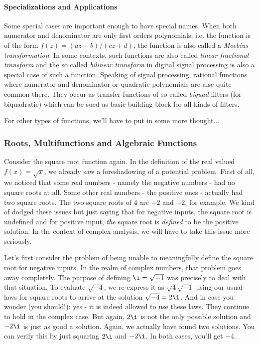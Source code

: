 \paragraph{Specializations and Applications}
Some special cases are important enough to have special names. When both numerator and denominator are only first orders polynomials, i.e. the function is of the form $f(z) = (a z  + b) / (c z + d)$, the function is also called a \emph{Moebius transformation}. In some contexts, such functions are also called \emph{linear fractional transform} and the so called \emph{bilinear transform} in digital signal processing is also a special case of such a function. Speaking of signal processing, rational functions where numerator and denominator or quadratic polynomials are alse quite common there. They occur as transfer functions of so called \emph{biquad} filters (for biquadratic) which can be sued as basic building block for all kinds of filters.


For other types of functions, we'll have to put in some more thought...



\subsubsection{Roots, Multifunctions and Algebraic Functions}
Consider the square root function again. In the definition of the real valued $f(x) = \sqrt{x}$, we already saw a foreshadowing of a potential problem. First of all, we noticed that some real numbers - namely the negative numbers - had no square roots at all. Some other real numbers - the positive ones - actually had two square roots. The two square roots of $4$ are $+2$ and $-2$, for example. We kind of dodged these issues but just saying that for negative inputs, the square root is undefined and for positive input, \emph{the} square root is \emph{defined} to be the positive solution. In the context of complex analysis, we will have to take this issue more seriously. 

\medskip
Let's first consider the problem of being unable to meaningfully define the square root for negative inputs. In the realm of complex numbers, that problem goes away completely. The purpose of defining $\i = \sqrt{-1}$ was precisely to deal with that situation. To evaluate $\sqrt{-4}$, we re-express it as $\sqrt{4} \sqrt{-1}$ using our usual laws for square roots to arrive at the solution $\sqrt{-4} = 2 \i$. And in case you wonder (you should!): yes - it is indeed allowed to use these laws. They continue to hold in the complex case. But again, $2 \i$ is not the only possible solution and $-2 \i$ is just as good a solution. Again, we actually have found two solutions. You can verify this by just squaring $2 \i$ and $-2 \i$. In both cases, you'll get $-4$.

